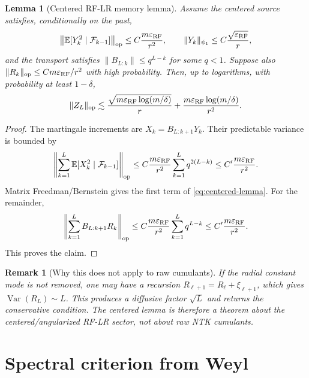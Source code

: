 \documentclass[11pt]{article}
\newtheorem{lemma}{Lemma}
\newtheorem{remark}{Remark}
\newcommand{\E}{\mathbb E}
\newcommand{\Var}{\operatorname{Var}}
\newcommand{\op}{\operatorname{op}}
\newcommand{\eps}{\varepsilon}
\begin{document}
\begin{lemma}[Centered RF-LR memory lemma]
Assume the centered source satisfies, conditionally on the past,
\begin{equation}
\left\|\E[Y_k^2\mid\mathcal F_{k-1}]\right\|_{\op}\le C\frac{m\eps_{\rm RF}}{r^2},
\qquad
\|Y_k\|_{\psi_1}\le C\frac{\sqrt{\eps_{\rm RF}}}{r},
\label{eq:Y-bound}
\end{equation}
and the transport satisfies $\|B_{L:k}\|\le q^{L-k}$ for some $q<1$.  Suppose also $\|R_k\|_{\op}\le C m\eps_{\rm RF}/r^2$ with high probability.  Then, up to logarithms, with probability at least $1-\delta$,
\begin{equation}
\|Z_L\|_{\op}\lesssim
\frac{\sqrt{m\eps_{\rm RF}\log(m/\delta)}}{r}
+
\frac{m\eps_{\rm RF}\log(m/\delta)}{r^2}.
\label{eq:centered-lemma}
\end{equation}
\end{lemma}

\begin{proof}
The martingale increments are $X_k=B_{L:k+1}Y_k$.  Their predictable variance is bounded by
\[
\left\|\sum_{k=1}^L\E[X_k^2\mid\mathcal F_{k-1}]\right\|_{\op}
\le
C\frac{m\eps_{\rm RF}}{r^2}\sum_{k=1}^Lq^{2(L-k)}
\le C'\frac{m\eps_{\rm RF}}{r^2}.
\]
Matrix Freedman/Bernstein gives the first term of \eqref{eq:centered-lemma}.  For the remainder,
\[
\left\|\sum_{k=1}^LB_{L:k+1}R_k\right\|_{\op}
\le C\frac{m\eps_{\rm RF}}{r^2}\sum_{k=1}^Lq^{L-k}
\le C'\frac{m\eps_{\rm RF}}{r^2}.
\]
This proves the claim.
\end{proof}

\begin{remark}[Why this does not apply to raw cumulants]
If the radial constant mode is not removed, one may have a recursion $R_{\ell+1}=R_\ell+\xi_{\ell+1}$, which gives $\Var(R_L)\sim L$.  This produces a diffusive factor $\sqrt L$ and returns the conservative condition.  The centered lemma is therefore a theorem about the centered/angularized RF-LR sector, not about raw NTK cumulants.
\end{remark}

\section{Spectral criterion from Weyl}
\end{document}
